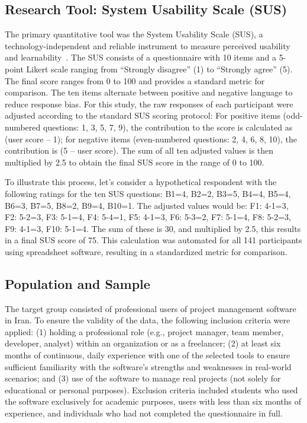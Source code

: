 \documentclass[runningheads]{llncs}
\begin{document}
\subsection{Research Tool: System Usability Scale (SUS)}
The primary quantitative tool was the System Usability Scale (SUS), a technology-independent and reliable instrument to measure perceived usability and learnability~\cite{borsci2015assessing}. The SUS consists of a questionnaire with 10 items and a 5-point Likert scale ranging from “Strongly disagree” (1) to “Strongly agree” (5). The final score ranges from 0 to 100 and provides a standard metric for comparison. The ten items alternate between positive and negative language to reduce response bias. For this study, the raw responses of each participant were adjusted according to the standard SUS scoring protocol: For positive items (odd-numbered questions: 1, 3, 5, 7, 9), the contribution to the score is calculated as (user score – 1); for negative items (even-numbered questions: 2, 4, 6, 8, 10), the contribution is (5 – user score). The sum of all ten adjusted values is then multiplied by 2.5 to obtain the final SUS score in the range of 0 to 100.



To illustrate this process, let’s consider a hypothetical respondent with the following ratings for the ten SUS questions: B1=4, B2=2, B3=5, B4=4, B5=4, B6=3, B7=5, B8=2, B9=4, B10=1. The adjusted values would be: F1: 4-1=3, F2: 5-2=3, F3: 5-1=4, F4: 5-4=1, F5: 4-1=3, F6: 5-3=2, F7: 5-1=4, F8: 5-2=3, F9: 4-1=3, F10: 5-1=4. The sum of these is 30, and multiplied by 2.5, this results in a final SUS score of 75. This calculation was automated for all 141 participants using spreadsheet software, resulting in a standardized metric for comparison.


\subsection{Population and Sample}
The target group consisted of professional users of project management software in Iran. To ensure the validity of the data, the following inclusion criteria were applied: (1) holding a professional role (e.g., project manager, team member, developer, analyst) within an organization or as a freelancer; (2) at least six months of continuous, daily experience with one of the selected tools to ensure sufficient familiarity with the software’s strengths and weaknesses in real-world scenarios; and (3) use of the software to manage real projects (not solely for educational or personal purposes). Exclusion criteria included students who used the software exclusively for academic purposes, users with less than six months of experience, and individuals who had not completed the questionnaire in full.
\end{document}
